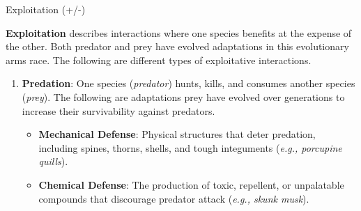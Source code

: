\documentclass[10pt]{article}
\begin{document}
    \begin{core}{Exploitation (+/-)}

      \textbf{Exploitation} describes interactions where one species benefits at the expense of the other. Both predator and prey have evolved adaptations in this evolutionary arms race. The following are different types of exploitative interactions.

      \begin{enumerate}

        \item \textbf{Predation}: One species (\textit{predator}) hunts, kills, and consumes another species (\textit{prey}). The following are adaptations prey have evolved over generations to increase their survivability against predators.

        \begin{itemize}

          \item \textbf{Mechanical Defense}: Physical structures that deter predation, including spines, thorns, shells, and tough integuments (\textit{e.g., porcupine quills}).

          \item \textbf{Chemical Defense}: The production of toxic, repellent, or unpalatable compounds that discourage predator attack (\textit{e.g., skunk musk}).






\end{itemize}
\end{enumerate}
\end{core}
\end{document}
